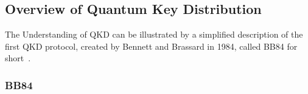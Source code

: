 \documentclass{article}
\begin{document}
\subsection{Overview of Quantum Key Distribution}
The Understanding of QKD can be illustrated by a simplified description of the first QKD protocol, created by Bennett and Brassard in 1984, called BB84 for short~\cite{Bennett_2014}.

\subsubsection{BB84}


\clearpage
\printbibliography
\end{document}
